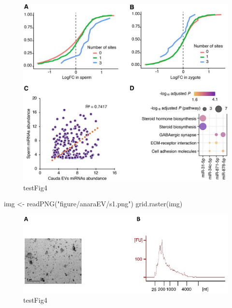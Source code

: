 \documentclass[12pt,twoside]{reedthesis}
\newenvironment{Shaded}{\begin{snugshade}}{\end{snugshade}}
\newcommand{\FunctionTok}[1]{\textcolor[rgb]{0.00,0.00,0.00}{#1}}
\newcommand{\NormalTok}[1]{#1}
\newcommand{\OtherTok}[1]{\textcolor[rgb]{0.56,0.35,0.01}{#1}}
\newcommand{\StringTok}[1]{\textcolor[rgb]{0.31,0.60,0.02}{#1}}
\begin{document}
\begin{figure}[H]

{\centering \includegraphics{thesis_files/figure-latex/fig4-1} 

}

\caption{testFig4}\label{fig:fig4}
\end{figure}
\begin{Shaded}
\begin{Highlighting}[]
\NormalTok{img }\OtherTok{\textless{}{-}} \FunctionTok{readPNG}\NormalTok{(}\StringTok{"figure/anaraEV/s1.png"}\NormalTok{)}
\FunctionTok{grid.raster}\NormalTok{(img)}
\end{Highlighting}
\end{Shaded}
\begin{figure}[H]

{\centering \includegraphics{thesis_files/figure-latex/sfig1-1} 

}

\caption{testFig4}\label{fig:sfig1}
\end{figure}
\end{document}
